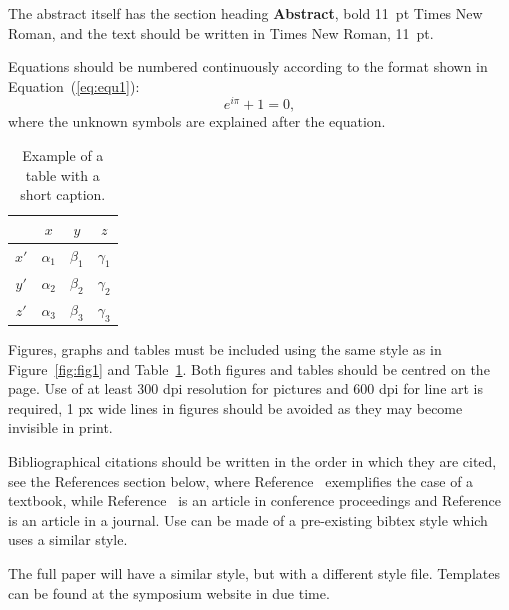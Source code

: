 \documentclass{bmd2010a}
\begin{document}
The abstract itself has the section heading \textbf{Abstract}, bold 11~pt
Times New Roman, and the text should be written in Times New Roman, 11~pt.

Equations should be numbered continuously according to the format
shown in Equation~(\ref{eq:equ1}):
\begin{equation} \label{eq:equ1}
e^{i\pi} + 1 = 0,
\end{equation}
where the unknown symbols are explained after the equation.

\begin{table}[h!]
\begin{center}
\caption{Example of a table with a short caption.} \label{tab:tab1}
\begin{tabular}{|c|ccc|}
\hline
    &  $x$  &  $y$  &  $z$ \\
\hline
$x'$  &  $\alpha_1$ & $\beta_1$ & $\gamma_1$ \\
$y'$  &  $\alpha_2$ & $\beta_2$ & $\gamma_2$ \\
$z'$  &  $\alpha_3$ & $\beta_3$ & $\gamma_3$ \\
\hline
\end{tabular}
\end{center}
\end{table}


Figures, graphs
and tables must be included using the same style as in Figure~\ref{fig:fig1}
and Table~\ref{tab:tab1}. Both figures and tables should be centred on the page. Use of at least 300 dpi resolution for pictures and 600 dpi for line art is required, 1 px wide lines in figures should be avoided as they may become invisible in print.

Bibliographical citations should be written in the
order in which they are cited, see the References section below, where
Reference~\cite{Pac02} exemplifies the case of a textbook, while
Reference~\cite{Ber07} is an article in conference proceedings and
Reference~\cite{Sha71} is an article in a journal. Use can be made of a
pre-existing bibtex style which uses a similar style.


The full paper will have a similar style, but with a different style file. Templates can be found at the symposium website in due time.
\end{document}
